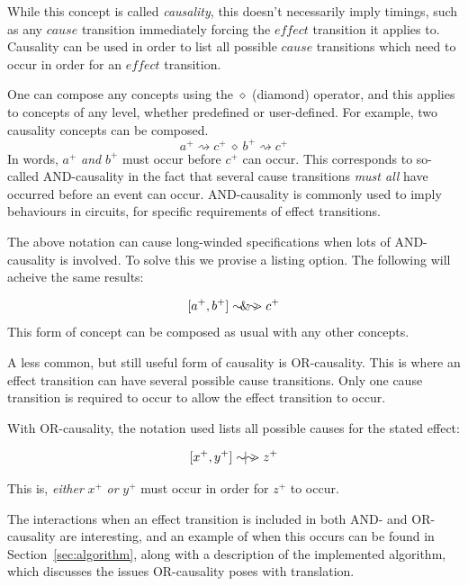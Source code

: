 \documentclass[british,conference,compsoc]{IEEEtran}
\begin{document}
While this concept is called \emph{causality}, this doesn't necessarily imply
timings, such as any $\mathit{cause}$ transition immediately forcing the
 $\mathit{effect}$ transition it applies to. Causality can be used in order to
list all possible $\mathit{cause}$ transitions which need to occur in order
 for an $\mathit{effect}$ transition.

One can compose any concepts using the $\diamond$ (diamond) operator, and this applies
to concepts of any level, whether predefined or user-defined. For example, 
two causality concepts can be composed.
\[
a^{+}\rightsquigarrow c^{+}\ \diamond\ b^{+}\rightsquigarrow c^{+}
\]
In words, $a^{+}$ \emph{and} $b^{+}$ must occur before $c^{+}$ can occur. 
This corresponds to so-called AND-causality in the fact that several cause transitions \emph{must all}
have occurred before an event can occur. AND-causality is commonly used
to imply behaviours in circuits, for specific requirements of effect transitions.  

The above notation can cause long-winded specifications when lots of AND-causality is involved. 
To solve this we provise a listing option. The following will acheive the same results:


\[
[a^{+}, b^{+}]\sim\hspace{-1.5mm}\&\hspace{-1.5mm}\sim\hspace{-1.5mm}>c^{+}
\]
This form of concept can be composed as usual with any other concepts.

A less common, but still useful form of causality is OR-causality. This is where an effect transition
can have several possible cause transitions. Only one cause transition is required to occur to allow
the effect transition to occur. 

With OR-causality, the notation used lists all possible causes for the stated effect:


\[
[x^{+}, y^{+}]\sim\hspace{-1.5mm}|\hspace{-1.5mm}\sim\hspace{-1.5mm}>z^{+}
\]

This is, \emph{either} $x^{+}$ \emph{or} $y^{+}$ must occur in order for 
$z^{+}$ to occur.

The interactions when an effect transition is included in both AND- and OR-causality are interesting, and
an example of when this occurs can be found in Section~\ref{sec:algorithm}, along with a description
of the implemented algorithm, which discusses the issues OR-causality poses with translation.
\end{document}
